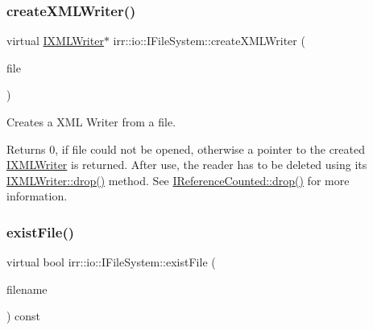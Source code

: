 \subsubsection{\texorpdfstring{create\+X\+M\+L\+Writer()}{createXMLWriter()}\hspace{0.1cm}{\footnotesize\ttfamily [2/2]}}
{\footnotesize\ttfamily virtual \hyperlink{classirr_1_1io_1_1IXMLWriter}{I\+X\+M\+L\+Writer}$\ast$ irr\+::io\+::\+I\+File\+System\+::create\+X\+M\+L\+Writer (\begin{DoxyParamCaption}\item[{\hyperlink{classirr_1_1io_1_1IWriteFile}{I\+Write\+File} $\ast$}]{file }\end{DoxyParamCaption})\hspace{0.3cm}{\ttfamily [pure virtual]}}



Creates a X\+ML Writer from a file. 

\begin{DoxyReturn}{Returns}
0, if file could not be opened, otherwise a pointer to the created \hyperlink{classirr_1_1io_1_1IXMLWriter}{I\+X\+M\+L\+Writer} is returned. After use, the reader has to be deleted using its \hyperlink{classirr_1_1IReferenceCounted_a03856a09355b89d178090c4a5f738543}{I\+X\+M\+L\+Writer\+::drop()} method. See \hyperlink{classirr_1_1IReferenceCounted_a03856a09355b89d178090c4a5f738543}{I\+Reference\+Counted\+::drop()} for more information. 
\end{DoxyReturn}
\mbox{\label{classirr_1_1io_1_1IFileSystem_a1c5e98bc16e38b1d15b44e24b1b3bd32}} 
\subsubsection{\texorpdfstring{exist\+File()}{existFile()}}
{\footnotesize\ttfamily virtual bool irr\+::io\+::\+I\+File\+System\+::exist\+File (\begin{DoxyParamCaption}\item[{const \hyperlink{namespaceirr_1_1io_ab1bdc45edb3f94d8319c02bc0f840ee1}{path} \&}]{filename }\end{DoxyParamCaption}) const\hspace{0.3cm}{\ttfamily [pure virtual]}}



